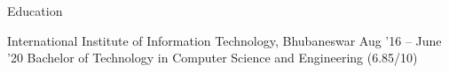 \documentclass{resume} %
\begin{document}

\begin{rSection}{Education}
  \begin{rEducationSection}{International Institute of Information Technology, Bhubaneswar}
                           {Aug '16 -- June '20}
                           {Bachelor of Technology in Computer Science and Engineering (6.85/10)}
  \end{rEducationSection}
\end{rSection}
\end{document}
